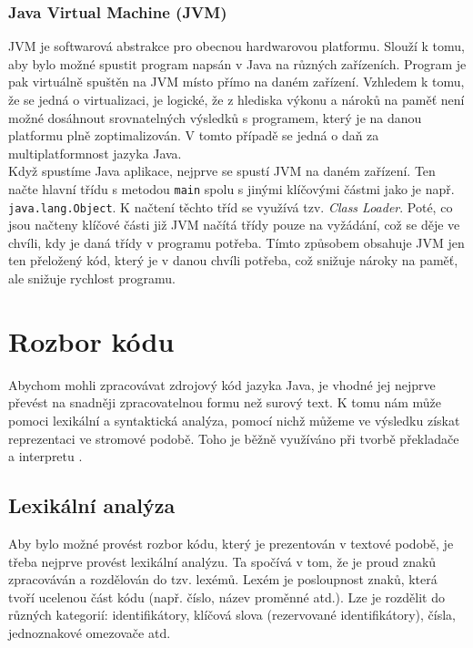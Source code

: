			\subsubsection{Java Virtual Machine (JVM)}			
				JVM je softwarová abstrakce pro obecnou hardwarovou platformu. Slouží k tomu, aby bylo možné spustit program napsán v Java na různých zařízeních. Program je pak virtuálně spuštěn na JVM místo přímo na daném zařízení. Vzhledem k tomu, že se jedná o virtualizaci, je logické, že z hlediska výkonu a nároků na paměť není možné dosáhnout srovnatelných výsledků s programem, který je na danou platformu plně zoptimalizován. V tomto případě se jedná o daň za multiplatformnost jazyka Java.\\ 
			
			Když spustíme Java aplikace, nejprve se spustí JVM na daném zařízení. Ten načte hlavní třídu s metodou \texttt{main} spolu s jinými klíčovými částmi jako je např. \texttt{java.lang.Object}. K načtení těchto tříd se využívá tzv. \emph{Class Loader}. Poté, co jsou načteny klíčové části již JVM načítá třídy pouze na vyžádání, což se děje ve chvíli, kdy je daná třídy v programu potřeba. Tímto způsobem obsahuje JVM jen ten přeložený kód, který je v danou chvíli potřeba, což snižuje nároky na paměť, ale snižuje rychlost programu. 
	
	\section{Rozbor kódu}
		Abychom mohli zpracovávat zdrojový kód jazyka Java, je vhodné jej nejprve převést na snadněji zpracovatelnou formu než surový text. K tomu nám může pomoci lexikální a syntaktická analýza, pomocí nichž můžeme ve výsledku získat reprezentaci ve stromové podobě. Toho je běžně využíváno při tvorbě překladače a interpretu \cite{compilerTutorial}\cite{basicsOfCompilerDesign}\cite{fjp}.
			
		\subsection{Lexikální analýza}
			Aby bylo možné provést rozbor kódu, který je prezentován v textové podobě, je třeba nejprve provést lexikální analýzu. Ta spočívá v tom, že je proud znaků zpracováván a rozdělován do tzv. lexémů. Lexém je posloupnost znaků, která tvoří ucelenou část kódu (např. číslo, název proměnné atd.). Lze je rozdělit do různých kategorií: identifikátory, klíčová slova (rezervované identifikátory), čísla, jednoznakové omezovače atd.\\
			
